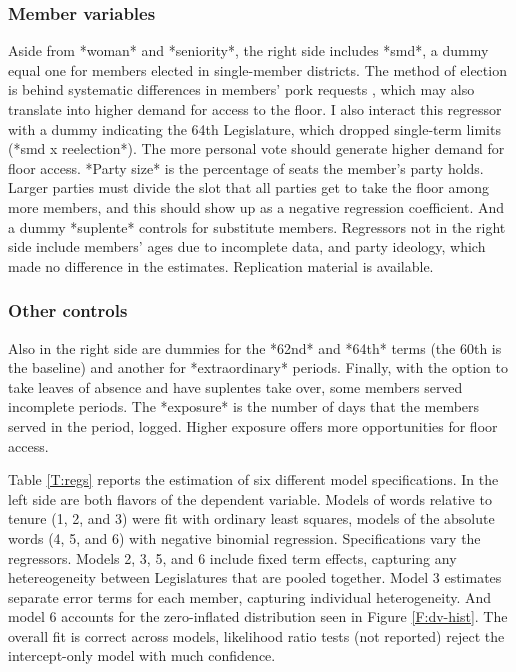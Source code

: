 \documentclass[letter,12pt]{article}
\begin{document}
    \subsubsection{Member variables}

Aside from *woman* and *seniority*, the right side includes *smd*, a dummy equal one for members elected in single-member districts.
The method of election is behind systematic differences in members' pork requests \citep{kerevelPork2015}, which may also translate into higher demand for access to the floor. I also interact this regressor with a dummy indicating the 64th Legislature, which dropped single-term limits (*smd x reelection*). The more personal vote should generate higher demand for floor access. *Party size* is the percentage of seats the member's party holds. Larger parties must divide the slot that all parties get to take the floor among more members, and this should show up as a negative regression coefficient. And a dummy *suplente* controls for substitute members. Regressors not in the right side include members' ages due to incomplete data, and party ideology, which made no difference in the estimates. Replication material is available. 

    \subsubsection{Other controls}

Also in the right side are dummies for the *62nd* and *64th* terms (the 60th is the baseline) and another for *extraordinary* periods. Finally, with the option to take leaves of absence and have suplentes take over, some members served incomplete periods. The *exposure* is the number of days that the members served in the period, logged. Higher exposure offers more opportunities for floor access. 


Table \ref{T:regs} reports the estimation of six different model specifications. In the left side are both flavors of the dependent variable. Models of words relative to tenure (1, 2, and 3) were fit with ordinary least squares, models of the absolute words (4, 5, and 6) with negative binomial regression. Specifications vary the regressors. Models 2, 3, 5, and 6 include fixed term effects, capturing any hetereogeneity between Legislatures that are pooled together. Model 3 estimates separate error terms for each member, capturing individual heterogeneity. And model 6 accounts for the zero-inflated  distribution seen in Figure \ref{F:dv-hist}. The overall fit is correct across models, likelihood ratio tests (not reported) reject the intercept-only model with much confidence. 
\end{document}
